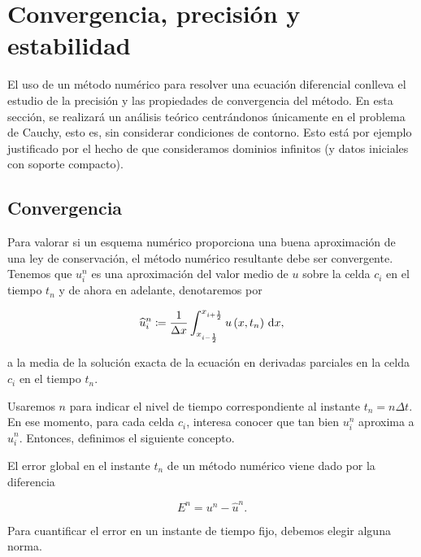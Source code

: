 \chapter{Convergencia, precisión y estabilidad}\label{ch:convergence}

El uso de un método numérico para resolver una ecuación diferencial
conlleva el estudio de la precisión y las propiedades de convergencia
del método.
En esta sección, se realizará un análisis teórico centrándonos
únicamente en el problema de Cauchy, esto es, sin considerar
condiciones de contorno.
Esto está por ejemplo justificado por el hecho de que consideramos
dominios infinitos (y datos iniciales con soporte compacto).

\section{Convergencia}

Para valorar si un esquema numérico proporciona una buena
aproximación de una ley de conservación, el método numérico
resultante debe ser convergente.
Tenemos que $u^{n}_{i}$ es una aproximación del valor medio de $u$
sobre la celda $c_{i}$ en el tiempo $t_{n}$ y de ahora en adelante,
denotaremos por

\begin{equation*}
  \widehat{u}^{n}_{i}\coloneqq
  \frac{1}{\Delta x}
  \int_{x_{i-\frac{1}{2}}}^{x_{i+\frac{1}{2}}}
  u\left(x,t_{n}\right)\dl x,
\end{equation*}

a la media de la solución exacta de la ecuación en derivadas
parciales en la celda $c_{i}$ en el tiempo $t_{n}$.

Usaremos $n$ para indicar el nivel de tiempo correspondiente al
instante $t_{n}=n\Delta t$.
En ese momento, para cada celda $c_{i}$, interesa conocer que tan
bien $u^{n}_{i}$ aproxima a $\widehat{u}^{n}_{i}$.
Entonces, definimos el siguiente concepto.

\begin{definition}
  El error global en el instante $t_{n}$ de un método numérico viene
  dado por la diferencia

  \begin{equation*}
    E^{n}=
    u^{n}-
    \widehat{u}^{n}.
  \end{equation*}

  Para cuantificar el error en un instante de tiempo fijo, debemos
  elegir alguna norma.
\end{definition}

